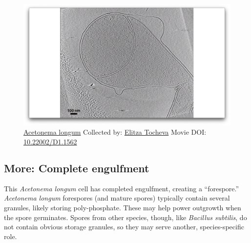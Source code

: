 \documentclass[]{tufte-book}
\begin{document}
\begin{figure}
\includegraphics{movie_stills/8_10} \caption[\protect\hyperlink{tree}{Acetonema longum} Collected by:
\protect\hyperlink{elitza_tocheva}{Elitza Tocheva} Movie DOI:
\href{https://doi.org/10.22002/D1.1562}{10.22002/D1.1562}]{\protect\hyperlink{tree}{Acetonema longum} Collected by:
\protect\hyperlink{elitza_tocheva}{Elitza Tocheva} Movie DOI:
\href{https://doi.org/10.22002/D1.1562}{10.22002/D1.1562}}\label{fig:8-10}
\end{figure}

\hypertarget{Complete_engulfment}{\subsection*{More: Complete
engulfment}\label{Complete_engulfment}}

This \emph{Acetonema longum} cell has completed engulfment, creating a
``forespore.'' \emph{Acetonema longum} forespores (and mature spores)
typically contain several granules, likely storing poly-phosphate. These
may help power outgrowth when the spore germinates. Spores from other
species, though, like \emph{Bacillus subtilis}, do not contain obvious
storage granules, so they may serve another, species-specific role.
\end{document}
